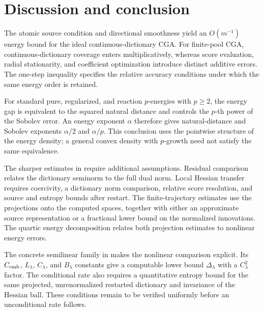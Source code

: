 \section{Discussion and conclusion}
\label{sec:discussion}

The atomic source condition and directional smoothness yield an \(O(m^{-1})\) energy bound
for the ideal continuous-dictionary CGA. For finite-pool CGA, continuous-dictionary coverage
enters multiplicatively, whereas score evaluation, radial stationarity, and coefficient
optimization introduce distinct additive errors. The one-step inequality specifies the relative
accuracy conditions under which the same energy order is retained.

For standard pure, regularized, and reaction \(p\)-energies with \(p\geq2\), the energy gap
is equivalent to the squared natural distance and controls the \(p\)-th power of the Sobolev
error. An energy exponent \(\alpha\) therefore gives natural-distance and Sobolev exponents
\(\alpha/2\) and \(\alpha/p\). This conclusion uses the pointwise structure of the energy
density; a general convex density with \(p\)-growth need not satisfy the same equivalence.

The sharper estimates in  require additional assumptions. Residual
comparison relates the dictionary seminorm to the full dual norm. Local Hessian transfer
requires coercivity, a dictionary norm comparison, relative score resolution, and source and entropy
bounds after restart. The finite-trajectory estimates use the projections onto the computed
spaces, together with either an approximate source representation or a
fractional lower bound on the normalized innovations. The quartic energy decomposition relates
both projection estimates to nonlinear energy errors.

The concrete semilinear family in  makes the nonlinear
comparison explicit. Its $C_{\rm emb}$, $L_\lambda$, $C_\lambda$, and $B_\lambda$
constants give a computable lower bound $\Delta_\lambda$ with a $C_\lambda^2$
factor. The conditional rate also requires a quantitative entropy bound for the same
projected, unrenormalized restarted dictionary and invariance of the Hessian ball.
These conditions remain to be verified uniformly before an unconditional rate follows.


